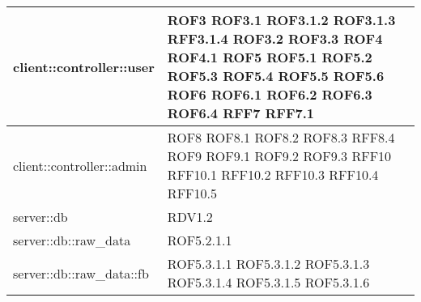 \begin{center}
\begin{longtable}{| p{9cm} | p{4cm} |}
client::controller::user  &  ROF3 \newline ROF3.1 \newline ROF3.1.2 \newline ROF3.1.3 \newline RFF3.1.4 \newline ROF3.2 \newline ROF3.3 \newline ROF4 \newline ROF4.1 \newline ROF5 \newline ROF5.1 \newline ROF5.2 \newline ROF5.3 \newline ROF5.4 \newline ROF5.5  \newline ROF5.6 \newline ROF6 \newline ROF6.1 \newline ROF6.2 \newline ROF6.3 \newline ROF6.4 \newline RFF7 \newline RFF7.1 \newline \\
\hline
client::controller::admin  &  ROF8 \newline ROF8.1 \newline ROF8.2 \newline ROF8.3 \newline RFF8.4 \newline ROF9 \newline ROF9.1 \newline ROF9.2 \newline ROF9.3 \newline RFF10 \newline RFF10.1 \newline RFF10.2 \newline RFF10.3 \newline RFF10.4 \newline RFF10.5 \newline \\
\hline
server::db  & RDV1.2 \newline \\
\hline
server::db::raw\_data  &  ROF5.2.1.1 \newline \\
\hline
server::db::raw\_data::fb  & ROF5.3.1.1 \newline ROF5.3.1.2 \newline ROF5.3.1.3 \newline ROF5.3.1.4 \newline ROF5.3.1.5 \newline ROF5.3.1.6 \newline \\

\end{longtable}
\end{center}
